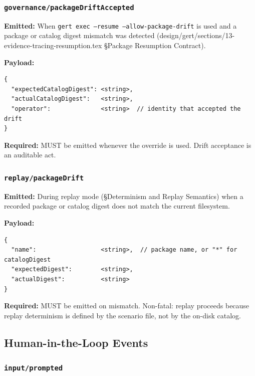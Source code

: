 
\subsubsection{\texttt{governance/packageDriftAccepted}}

\textbf{Emitted:} When \texttt{gert exec --resume --allow-package-drift} is
used and a package or catalog digest mismatch was detected
(design/gert/sections/13-evidence-tracing-resumption.tex §Package
Resumption Contract).

\textbf{Payload:}
\begin{verbatim}
{
  "expectedCatalogDigest": <string>,
  "actualCatalogDigest":   <string>,
  "operator":              <string>  // identity that accepted the drift
}
\end{verbatim}

\textbf{Required:} MUST be emitted whenever the override is used. Drift
acceptance is an auditable act.


\subsubsection{\texttt{replay/packageDrift}}

\textbf{Emitted:} During replay mode (§Determinism and Replay Semantics)
when a recorded package or catalog digest does not match the current
filesystem.

\textbf{Payload:}
\begin{verbatim}
{
  "name":                  <string>,  // package name, or "*" for catalogDigest
  "expectedDigest":        <string>,
  "actualDigest":          <string>
}
\end{verbatim}

\textbf{Required:} MUST be emitted on mismatch. Non-fatal: replay proceeds
because replay determinism is defined by the scenario file, not by the
on-disk catalog.


\subsection{Human-in-the-Loop Events}

\subsubsection{\texttt{input/prompted}}

